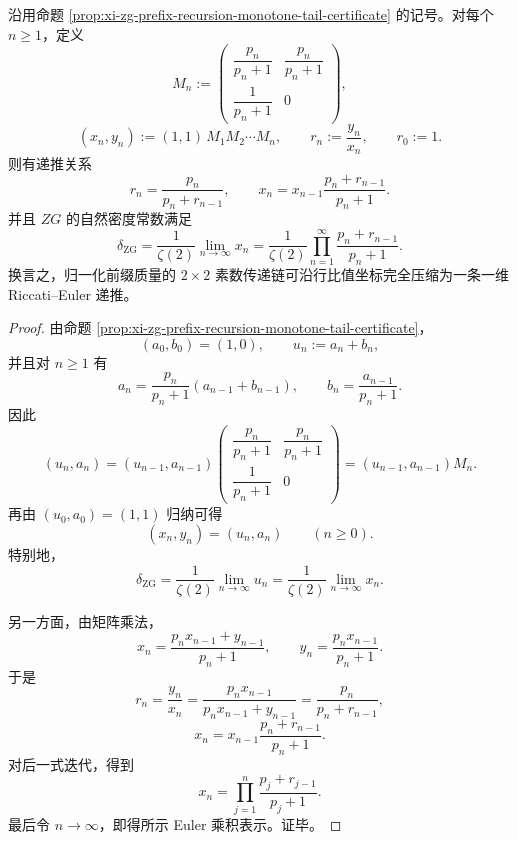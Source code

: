 \begin{theorem}\label{thm:xi-time-part62dcb-zg-density-row-ratio-riccati-product}
沿用命题 \ref{prop:xi-zg-prefix-recursion-monotone-tail-certificate} 的记号。对每个 \(n\ge 1\)，定义
\[
M_n:=
\begin{pmatrix}
\dfrac{p_n}{p_n+1} & \dfrac{p_n}{p_n+1}\\[1mm]
\dfrac{1}{p_n+1} & 0
\end{pmatrix},
\]
\[
(x_n,y_n):=(1,1)\,M_1M_2\cdots M_n,
\qquad
r_n:=\frac{y_n}{x_n},
\qquad
r_0:=1.
\]
则有递推关系
\[
r_n=\frac{p_n}{p_n+r_{n-1}},
\qquad
x_n=x_{n-1}\frac{p_n+r_{n-1}}{p_n+1}.
\]
并且 \(ZG\) 的自然密度常数满足
\[
\delta_{\mathrm{ZG}}
=
\frac{1}{\zeta(2)}\lim_{n\to\infty}x_n
=
\frac{1}{\zeta(2)}
\prod_{n=1}^{\infty}\frac{p_n+r_{n-1}}{p_n+1}.
\]
换言之，归一化前缀质量的 \(2\times 2\) 素数传递链可沿行比值坐标完全压缩为一条一维 Riccati--Euler 递推。
\end{theorem}
\begin{proof}
由命题 \ref{prop:xi-zg-prefix-recursion-monotone-tail-certificate}，
\[
(a_0,b_0)=(1,0),
\qquad
u_n:=a_n+b_n,
\]
并且对 \(n\ge 1\) 有
\[
a_n=\frac{p_n}{p_n+1}(a_{n-1}+b_{n-1}),
\qquad
b_n=\frac{a_{n-1}}{p_n+1}.
\]
因此
\[
(u_n,a_n)
=(u_{n-1},a_{n-1})
\begin{pmatrix}
\dfrac{p_n}{p_n+1} & \dfrac{p_n}{p_n+1}\\[1mm]
\dfrac{1}{p_n+1} & 0
\end{pmatrix}
=(u_{n-1},a_{n-1})M_n.
\]
再由 \((u_0,a_0)=(1,1)\) 归纳可得
\[
(x_n,y_n)=(u_n,a_n)
\qquad (n\ge 0).
\]
特别地，
\[
\delta_{\mathrm{ZG}}
=
\frac{1}{\zeta(2)}\lim_{n\to\infty}u_n
=
\frac{1}{\zeta(2)}\lim_{n\to\infty}x_n.
\]

另一方面，由矩阵乘法，
\[
x_n=\frac{p_nx_{n-1}+y_{n-1}}{p_n+1},
\qquad
y_n=\frac{p_nx_{n-1}}{p_n+1}.
\]
于是
\[
r_n
=
\frac{y_n}{x_n}
=
\frac{p_nx_{n-1}}{p_nx_{n-1}+y_{n-1}}
=
\frac{p_n}{p_n+r_{n-1}},
\]
\[
x_n
=
x_{n-1}\frac{p_n+r_{n-1}}{p_n+1}.
\]
对后一式迭代，得到
\[
x_n=\prod_{j=1}^{n}\frac{p_j+r_{j-1}}{p_j+1}.
\]
最后令 \(n\to\infty\)，即得所示 Euler 乘积表示。证毕。
\end{proof}

